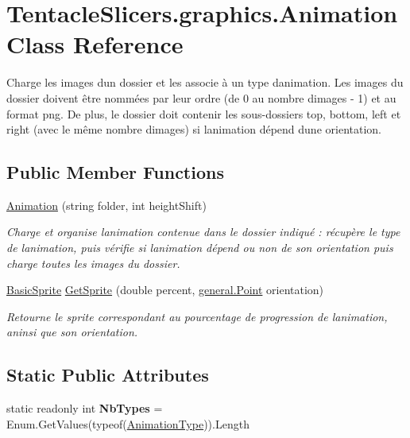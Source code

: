 \hypertarget{class_tentacle_slicers_1_1graphics_1_1_animation}{}\section{Tentacle\+Slicers.\+graphics.\+Animation Class Reference}
\label{class_tentacle_slicers_1_1graphics_1_1_animation}


Charge les images d\textquotesingle{}un dossier et les associe à un type d\textquotesingle{}animation. Les images du dossier doivent être nommées par leur ordre (de 0 au nombre d\textquotesingle{}images -\/ 1) et au format png. De plus, le dossier doit contenir les sous-\/dossiers top, bottom, left et right (avec le même nombre d\textquotesingle{}images) si l\textquotesingle{}animation dépend d\textquotesingle{}une orientation.  


\subsection*{Public Member Functions}
\begin{DoxyCompactItemize}
\item 
\hyperlink{class_tentacle_slicers_1_1graphics_1_1_animation_a4534bab47880e19031ce441090405731}{Animation} (string folder, int height\+Shift)
\begin{DoxyCompactList}\small\item\em Charge et organise l\textquotesingle{}animation contenue dans le dossier indiqué \+: récupère le type de l\textquotesingle{}animation, puis vérifie si l\textquotesingle{}animation dépend ou non de son orientation puis charge toutes les images du dossier. \end{DoxyCompactList}\item 
\hyperlink{class_tentacle_slicers_1_1graphics_1_1_basic_sprite}{Basic\+Sprite} \hyperlink{class_tentacle_slicers_1_1graphics_1_1_animation_a9575afe2c888a8b4edcf44bca95ac934}{Get\+Sprite} (double percent, \hyperlink{class_tentacle_slicers_1_1general_1_1_point}{general.\+Point} orientation)
\begin{DoxyCompactList}\small\item\em Retourne le sprite correspondant au pourcentage de progression de l\textquotesingle{}animation, aninsi que son orientation. \end{DoxyCompactList}\end{DoxyCompactItemize}
\subsection*{Static Public Attributes}
\begin{DoxyCompactItemize}
\item 
\mbox{\label{class_tentacle_slicers_1_1graphics_1_1_animation_afe5c6298cd213b6e5c86e00798dda3be}} 
static readonly int {\bfseries Nb\+Types} = Enum.\+Get\+Values(typeof(\hyperlink{namespace_tentacle_slicers_1_1graphics_a9c92bd633d714099730f10897a01950b}{Animation\+Type})).Length
\end{DoxyCompactItemize}

